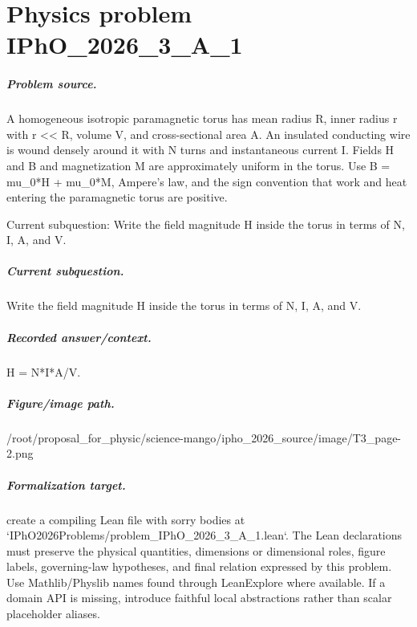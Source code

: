 
\chapter{Physics problem IPhO\_2026\_3\_A\_1}
\label{ch:IPhO2026Problems_problem_IPhO_2026_3_A_1}

\paragraph{Problem source.}
A homogeneous isotropic paramagnetic torus has mean radius R, inner radius r
with r << R, volume V, and cross-sectional area A.  An insulated conducting
wire is wound densely around it with N turns and instantaneous current I.
Fields H and B and magnetization M are approximately uniform in the torus.
Use B = mu\_0*H + mu\_0*M, Ampere's law, and the sign convention that work and
heat entering the paramagnetic torus are positive.

Current subquestion:
Write the field magnitude H inside the torus in terms of N, I, A, and V.

\paragraph{Current subquestion.}
Write the field magnitude H inside the torus in terms of N, I, A, and V.

\paragraph{Recorded answer/context.}
H = N*I*A/V.

\paragraph{Figure/image path.}
/root/proposal\_for\_physic/science-mango/ipho\_2026\_source/image/T3\_page-2.png

\paragraph{Formalization target.}
create a compiling Lean file with sorry bodies at `IPhO2026Problems/problem\_IPhO\_2026\_3\_A\_1.lean`.
The Lean declarations must preserve the physical quantities, dimensions or dimensional roles, figure labels, governing-law hypotheses, and final relation expressed by this problem.
Use Mathlib/Physlib names found through LeanExplore where available. If a domain API is missing, introduce faithful local abstractions rather than scalar placeholder aliases.

